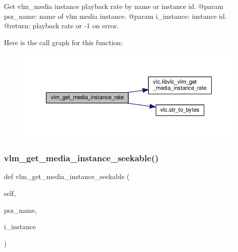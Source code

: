 \begin{DoxyVerb}Get vlm_media instance playback rate by name or instance id.
@param psz_name: name of vlm media instance.
@param i_instance: instance id.
@return: playback rate or -1 on error.
\end{DoxyVerb}
 Here is the call graph for this function\+:
\nopagebreak
\begin{figure}[H]
\begin{center}
\leavevmode
\includegraphics[width=350pt]{classvlc_1_1_instance_aa77010aa624034fe43391cb0604f7d08_cgraph}
\end{center}
\end{figure}
\mbox{\label{classvlc_1_1_instance_a9163e1a129b34347564989ec3c860785}} 
\subsubsection{\texorpdfstring{vlm\+\_\+get\+\_\+media\+\_\+instance\+\_\+seekable()}{vlm\_get\_media\_instance\_seekable()}}
{\footnotesize\ttfamily def vlm\+\_\+get\+\_\+media\+\_\+instance\+\_\+seekable (\begin{DoxyParamCaption}\item[{}]{self,  }\item[{}]{psz\+\_\+name,  }\item[{}]{i\+\_\+instance }\end{DoxyParamCaption})}

